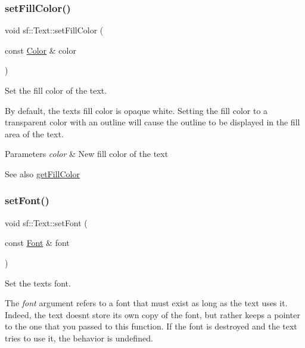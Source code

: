 \subsubsection{\texorpdfstring{set\+Fill\+Color()}{setFillColor()}}
{\footnotesize\ttfamily void sf\+::\+Text\+::set\+Fill\+Color (\begin{DoxyParamCaption}\item[{const \hyperlink{classsf_1_1_color}{Color} \&}]{color }\end{DoxyParamCaption})}



Set the fill color of the text. 

By default, the text\textquotesingle{}s fill color is opaque white. Setting the fill color to a transparent color with an outline will cause the outline to be displayed in the fill area of the text.


\begin{DoxyParams}{Parameters}
{\em color} & New fill color of the text\\
\hline
\end{DoxyParams}
\begin{DoxySeeAlso}{See also}
\hyperlink{classsf_1_1_text_a6b4ba8c435b59e1e05f831e6230dc537}{get\+Fill\+Color} 
\end{DoxySeeAlso}
\mbox{\label{classsf_1_1_text_a2927805d1ae92d57f15034ea34756b81}} 
\subsubsection{\texorpdfstring{set\+Font()}{setFont()}}
{\footnotesize\ttfamily void sf\+::\+Text\+::set\+Font (\begin{DoxyParamCaption}\item[{const \hyperlink{classsf_1_1_font}{Font} \&}]{font }\end{DoxyParamCaption})}



Set the text\textquotesingle{}s font. 

The {\itshape font} argument refers to a font that must exist as long as the text uses it. Indeed, the text doesn\textquotesingle{}t store its own copy of the font, but rather keeps a pointer to the one that you passed to this function. If the font is destroyed and the text tries to use it, the behavior is undefined.


